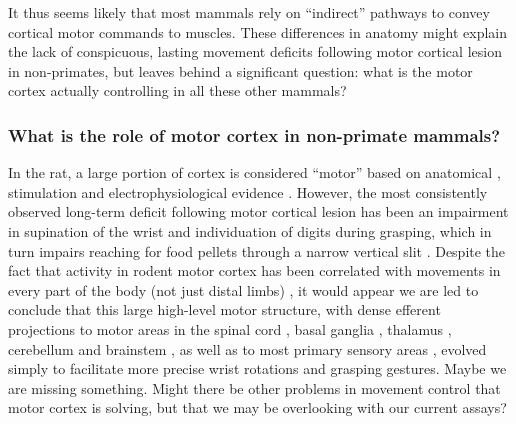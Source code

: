 It thus seems likely that most mammals rely on ``indirect'' pathways to convey cortical motor commands to muscles. These differences in anatomy might explain the lack of conspicuous, lasting movement deficits following motor cortical lesion in non-primates, but leaves behind a significant question: what is the motor cortex actually controlling in all these other mammals?

\subsubsection*{What is the role of motor cortex in non-primate mammals?}

In the rat, a large portion of cortex is considered ``motor'' based on anatomical \cite{Donoghue1982}, stimulation \cite{Donoghue1982,Neafsey1986} and electrophysiological evidence \cite{Hyland1998}. However, the most consistently observed long-term deficit following motor cortical lesion has been an impairment in supination of the wrist and individuation of digits during grasping, which in turn impairs reaching for food pellets through a narrow vertical slit \cite{Whishaw1991,Alaverdashvili2008a}. Despite the fact that activity in rodent motor cortex has been correlated with movements in every part of the body (not just distal limbs) \cite{Hill2011,Erlich2011}, it would appear we are led to conclude that this large high-level motor structure, with dense efferent projections to motor areas in the spinal cord \cite{Kuypers1981}, basal ganglia \cite{Turner2000,Wu2009}, thalamus \cite{Lee2008}, cerebellum \cite{Baker2001} and brainstem \cite{Jarratt1999}, as well as to most primary sensory areas \cite{Petreanu2012,Schneider2014}, evolved simply to facilitate more precise wrist rotations and grasping gestures. Maybe we are missing something. Might there be other problems in movement control that motor cortex is solving, but that we may be overlooking with our current assays?

